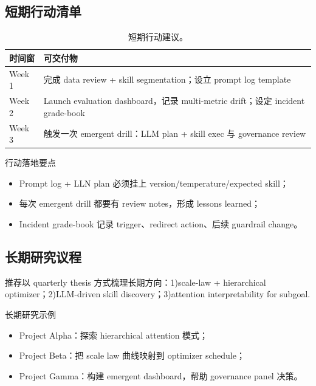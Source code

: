 \documentclass[a4paper]{article}
\begin{document}
\subsection{短期行动清单}

\begin{table}[H]
\centering
\begin{tabular}{p{3cm}p{6cm}}
\toprule
时间窗 & 可交付物 \\
\midrule
Week 1 & 完成 data review + skill segmentation；设立 prompt log template \\
Week 2 & Launch evaluation dashboard，记录 multi-metric drift；设定 incident grade-book \\
Week 3 & 触发一次 emergent drill：LLM plan + skill exec 与 governance review \\
\bottomrule
\end{tabular}
\caption{短期行动建议。}
\end{table}

\begin{importantbox}{行动落地要点}
\begin{itemize}
    \item Prompt log + LLN plan 必须挂上 version/temperature/expected skill；
    \item 每次 emergent drill 都要有 review notes，形成 lessons learned；
    \item Incident grade-book 记录 trigger、redirect action、后续 guardrail change。
\end{itemize}
\end{importantbox}

\subsection{长期研究议程}

推荐以 quarterly thesis 方式梳理长期方向：1)scale-law + hierarchical optimizer；2)LLM-driven skill discovery；3)attention interpretability for subgoal.

\begin{knowledgebox}{长期研究示例}
\begin{itemize}
    \item Project Alpha：探索 hierarchical attention 模式；
    \item Project Beta：把 scale law 曲线映射到 optimizer schedule；
    \item Project Gamma：构建 emergent dashboard，帮助 governance panel 决策。
\end{itemize}
\end{knowledgebox}
\end{document}
